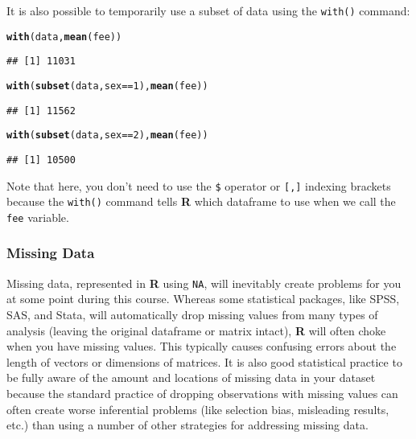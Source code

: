 \documentclass[12pt]{article}\usepackage[]{graphicx}\usepackage[]{color}
\makeatletter
\newcommand{\hlnum}[1]{\textcolor[rgb]{0.686,0.059,0.569}{#1}}%
\newcommand{\hlopt}[1]{\textcolor[rgb]{0,0,0}{#1}}%
\newcommand{\hlstd}[1]{\textcolor[rgb]{0.345,0.345,0.345}{#1}}%
\newcommand{\hlkwd}[1]{\textcolor[rgb]{0.737,0.353,0.396}{\textbf{#1}}}%
\newenvironment{kframe}{%
 \def\at@end@of@kframe{}%
 \ifinner\ifhmode%
  \def\at@end@of@kframe{\end{minipage}}%
  \begin{minipage}{\columnwidth}%
 \fi\fi%
 \def\FrameCommand##1{\hskip\@totalleftmargin \hskip-\fboxsep
 \colorbox{shadecolor}{##1}\hskip-\fboxsep
     \hskip-\linewidth \hskip-\@totalleftmargin \hskip\columnwidth}%
 \MakeFramed {\advance\hsize-\width
   \@totalleftmargin\z@ \linewidth\hsize
   \@setminipage}}%
 {\par\unskip\endMakeFramed%
 \at@end@of@kframe}
\newenvironment{knitrout}{}{} %
\makeatother
\begin{document}
It is also possible to temporarily use a subset of data using the \verb|with()| command:
\begin{knitrout}
\color{fgcolor}\begin{kframe}
\begin{alltt}
\hlkwd{with}\hlstd{(data,} \hlkwd{mean}\hlstd{(fee))}
\end{alltt}
\begin{verbatim}
## [1] 11031
\end{verbatim}
\begin{alltt}
\hlkwd{with}\hlstd{(}\hlkwd{subset}\hlstd{(data, sex} \hlopt{==} \hlnum{1}\hlstd{),} \hlkwd{mean}\hlstd{(fee))}
\end{alltt}
\begin{verbatim}
## [1] 11562
\end{verbatim}
\begin{alltt}
\hlkwd{with}\hlstd{(}\hlkwd{subset}\hlstd{(data, sex} \hlopt{==} \hlnum{2}\hlstd{),} \hlkwd{mean}\hlstd{(fee))}
\end{alltt}
\begin{verbatim}
## [1] 10500
\end{verbatim}
\end{kframe}
\end{knitrout}

Note that here, you don't need to use the \verb|$| operator or \verb|[,]| indexing brackets because the \verb|with()| command tells \textbf{R} which dataframe to use when we call the \verb|fee| variable.

\subsubsection{Missing Data}
Missing data, represented in \textbf{R} using \verb|NA|, will inevitably create problems for you at some point during this course. Whereas some statistical packages, like SPSS, SAS, and Stata, will automatically drop missing values from many types of analysis (leaving the original dataframe or matrix intact), \textbf{R} will often choke when you have missing values. This typically causes confusing errors about the length of vectors or dimensions of matrices. It is also good statistical practice to be fully aware of the amount and locations of missing data in your dataset because the standard practice of dropping observations with missing values can often create worse inferential problems (like selection bias, misleading results, etc.) than using a number of other strategies for addressing missing data.
\end{document}
